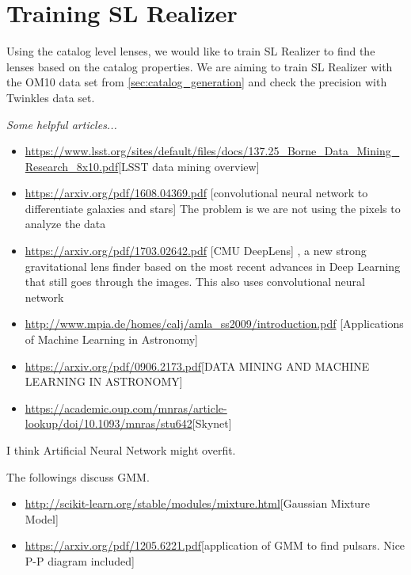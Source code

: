 \documentclass[\docopts]{\docclass}
\begin{document}
\section{Training SL Realizer}
\label{sec:sl_realizer_train}

Using the catalog level lenses, we would like to train SL Realizer to find the lenses based on the catalog properties. We are aiming to train SL Realizer with the OM10 data set from \ref{sec:catalog_generation} and check the precision with Twinkles data set.

\textit{Some helpful articles...}

\begin{itemize}
  \item \url{https://www.lsst.org/sites/default/files/docs/137.25_Borne_Data_Mining_Research_8x10.pdf}[LSST data mining overview]
 \item \url{https://arxiv.org/pdf/1608.04369.pdf} [convolutional neural network to differentiate galaxies and stars] The problem is we are not using the pixels to analyze the data
 \item \url{https://arxiv.org/pdf/1703.02642.pdf} [CMU DeepLens] , a new strong gravitational lens finder based on the most recent advances in Deep Learning that still goes through the images. This also uses convolutional neural network
  \item \url{http://www.mpia.de/homes/calj/amla_ss2009/introduction.pdf} [Applications of Machine Learning in Astronomy]
  \item \url{https://arxiv.org/pdf/0906.2173.pdf}[DATA MINING AND MACHINE LEARNING IN ASTRONOMY]
  \item \url{https://academic.oup.com/mnras/article-lookup/doi/10.1093/mnras/stu642}[Skynet]
  
  
\end{itemize}

I think Artificial Neural Network might overfit.

The followings discuss GMM.

\begin{itemize}

\item \url{http://scikit-learn.org/stable/modules/mixture.html}[Gaussian Mixture Model]
\item \url{https://arxiv.org/pdf/1205.6221.pdf}[application of GMM to find pulsars. Nice P-P diagram included]
\end{itemize}
\end{document}
